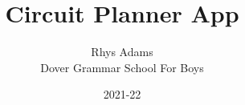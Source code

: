 \title{Circuit Planner App}

\date{2021-22}
\author{Rhys Adams\\ Dover Grammar School For Boys}

\maketitle
\newpage
